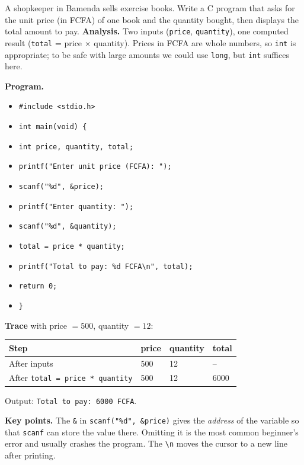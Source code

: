 \documentclass[11pt]{article}
\begin{document}
\begin{exoresolu}
A shopkeeper in Bamenda sells exercise books. Write a C program that asks for the unit price (in FCFA) of one book and the quantity bought, then displays the total amount to pay.
\tcblower
\textbf{Analysis.} Two inputs (\texttt{price}, \texttt{quantity}), one computed result (\texttt{total} = price $\times$ quantity). Prices in FCFA are whole numbers, so \texttt{int} is appropriate; to be safe with large amounts we could use \texttt{long}, but \texttt{int} suffices here.

\textbf{Program.}
\begin{itemize}
\item \texttt{\#include <stdio.h>}
\item \texttt{int main(void) \{}
\item \texttt{\quad int price, quantity, total;}
\item \texttt{\quad printf("Enter unit price (FCFA): ");}
\item \texttt{\quad scanf("\%d", \&price);}
\item \texttt{\quad printf("Enter quantity: ");}
\item \texttt{\quad scanf("\%d", \&quantity);}
\item \texttt{\quad total = price * quantity;}
\item \texttt{\quad printf("Total to pay: \%d FCFA\textbackslash n", total);}
\item \texttt{\quad return 0;}
\item \texttt{\}}
\end{itemize}

\textbf{Trace} with price $= 500$, quantity $= 12$:
\begin{center}
\begin{tabular}{|l|l|l|l|}
\hline
\rowcolor{popblueL} Step & price & quantity & total \\ \hline
After inputs & 500 & 12 & -- \\ \hline
After \texttt{total = price * quantity} & 500 & 12 & 6000 \\ \hline
\end{tabular}
\end{center}
Output: \texttt{Total to pay: 6000 FCFA}.

\textbf{Key points.} The \texttt{\&} in \texttt{scanf("\%d", \&price)} gives the \emph{address} of the variable so that \texttt{scanf} can store the value there. Omitting it is the most common beginner's error and usually crashes the program. The \texttt{\textbackslash n} moves the cursor to a new line after printing.
\end{exoresolu}
\end{document}
